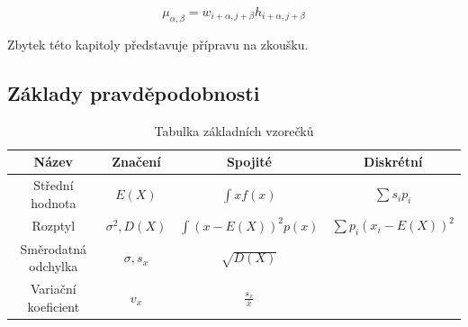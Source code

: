 \documentclass[11pt,a4paper]{scrartcl}
\begin{document}
	\begin{equation}
		\mu_{\alpha,\beta} = w_{i+\alpha, j+\beta} h_{i+\alpha, j+\beta}
		\label{eq:mu}
	\end{equation}
	
	Zbytek této kapitoly představuje přípravu na zkoušku.
	
	\subsection{Základy pravděpodobnosti}
	\begin{table}[H]
		\centering
		\begin{tabular}{|c|c|c|c|}
			\hline
			Název & Značení & Spojité & Diskrétní \\
			\hline
			\hline
			Střední hodnota & $E(X)$ & $\int{xf(x)}$ & $\sum s_ip_i$ \\
			\hline
			Rozptyl & $\sigma^2, D(X)$ & $\int{(x-E(X))^2p(x)}$& $\sum p_i(x_i - E(X))^2$ \\
			\hline
			Směrodatná odchylka & $\sigma, s_x$ & $\sqrt{D(X)}$ & \\
			\hline
			Variační koeficient & $v_x$ & $\frac{s_x}{\bar{x}}$ & \\
			\hline
		\end{tabular}
		\caption{Tabulka základních vzorečků}
	\end{table}
\end{document}
